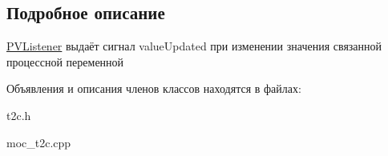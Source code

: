 \subsection{Подробное описание}
\hyperlink{class_p_v_listener}{P\-V\-Listener} выдаёт сигнал value\-Updated при изменении значения связанной процессной переменной 

Объявления и описания членов классов находятся в файлах\-:\begin{DoxyCompactItemize}
\item 
t2c.\-h\item 
moc\-\_\-t2c.\-cpp\end{DoxyCompactItemize}
